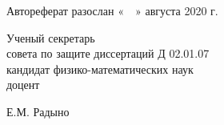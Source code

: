 \documentclass[_00_autoref.tex]{subfiles}
\begin{document}
\noindent Автореферат разослан «$\quad$» августа 2020 г.\\

\noindent
\begin{minipage}[b]{0.6\textwidth}
\begin{flushleft}
Ученый секретарь \\
совета по защите диссертаций Д 02.01.07 \\
кандидат физико-математических наук \\
доцент
\end{flushleft}
\end{minipage}
\begin{minipage}[b]{0.39\textwidth}
\begin{flushright}
Е.М. Радыно 
\end{flushright}
\end{minipage}
\eject

\pagestyle{plain}
\setcounter{page}{1}
\setlength{\voffset}{-8mm}
\end{document}
